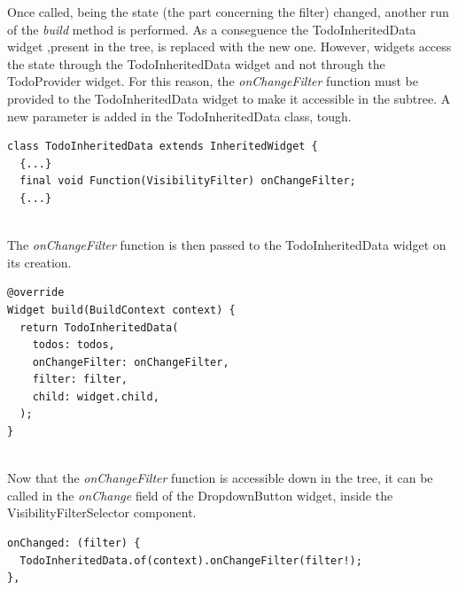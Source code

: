 Once called, being the state (the part concerning the filter) changed, another run of the \textit{build} method is performed. As a conseguence the TodoInheritedData widget ,present in the tree, is replaced with the new one.
However, widgets access the state through the TodoInheritedData widget and not through the TodoProvider widget. For this reason,
the \textit{onChangeFilter   }function must be provided to the TodoInheritedData widget to make it accessible in the subtree. A new parameter is added in the TodoInheritedData class, tough.
\mbox{}\\
\begin{code}
\mbox{}
\label{code:2.24}
\begin{verbatim}
class TodoInheritedData extends InheritedWidget {
  {...}
  final void Function(VisibilityFilter) onChangeFilter;
  {...}
\end{verbatim}
\end{code}
\mbox{}\\
The \textit{onChangeFilter} function is then passed to the TodoInheritedData widget on its creation.
 \mbox{}\\
\mbox{}
\begin{code}
\label{code:2.25}
\begin{verbatim}
@override
Widget build(BuildContext context) {
  return TodoInheritedData(
    todos: todos,
    onChangeFilter: onChangeFilter,
    filter: filter,
    child: widget.child,
  );
}

\end{verbatim}
\end{code}
 \mbox{}\\
Now that the \textit{onChangeFilter   }function is accessible down in the tree, it can be called in the \textit{onChange }field of the DropdownButton widget, inside the VisibilityFilterSelector component.
\mbox{}\\
\mbox{}
\begin{code}

\label{code:2.26}
\begin{verbatim}
onChanged: (filter) {
  TodoInheritedData.of(context).onChangeFilter(filter!);
},
\end{verbatim}
\end{code}
\mbox{}\\

